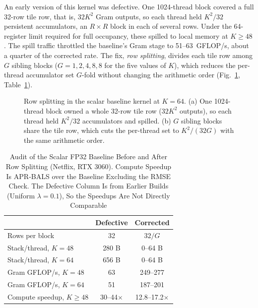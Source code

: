 An early version of this kernel was defective. One 1024-thread block covered a full 32-row tile row, that is, $32K^{2}$ Gram outputs, so each thread held $K^{2}/32$ persistent accumulators, an $R \times R$ block in each of several rows. Under the 64-register limit required for full occupancy, these spilled to local memory at $K \ge 48$. The spill traffic throttled the baseline's Gram stage to 51--63~GFLOP/s, about a quarter of the corrected rate. The fix, \textit{row splitting}, divides each tile row among $G$ sibling blocks ($G = 1, 2, 4, 8, 8$ for the five values of $K$), which reduces the per-thread accumulator set $G$-fold without changing the arithmetic order (Fig.~\ref{fig:rowsplit}, Table~\ref{tab:baselineaudit}).

\begin{figure}[!t]
\centering

\caption{Row splitting in the scalar baseline kernel at $K=64$. (a) One 1024-thread block owned a whole 32-row tile row ($32K^2$ outputs), so each thread held $K^2/32$ accumulators and spilled. (b) $G$ sibling blocks share the tile row, which cuts the per-thread set to $K^2/(32G)$ with the same arithmetic order.}
\label{fig:rowsplit}
\end{figure}

\begin{table}[!t]
\caption{Audit of the Scalar FP32 Baseline Before and After Row Splitting (Netflix, RTX 3060). Compute Speedup Is APR-BALS over the Baseline Excluding the RMSE Check. The Defective Column Is from Earlier Builds (Uniform $\lambda = 0.1$), So the Speedups Are Not Directly Comparable}
\label{tab:baselineaudit}
\centering
\footnotesize
\renewcommand{\arraystretch}{1.1}
\setlength{\tabcolsep}{4pt}
\begin{tabular}{lcc}
\toprule
 & \textbf{Defective} & \textbf{Corrected} \\
\midrule
Rows per block & 32 & $32/G$ \\
Stack/thread, $K{=}48$ & 280 B & 0--64 B \\
Stack/thread, $K{=}64$ & 656 B & 0--64 B \\
Gram GFLOP/s, $K{=}48$ & 63 & 249--277 \\
Gram GFLOP/s, $K{=}64$ & 51 & 187--201 \\
Compute speedup, $K \ge 48$ & 30--44$\times$ & 12.8--17.2$\times$ \\
\bottomrule
\end{tabular}
\end{table}

